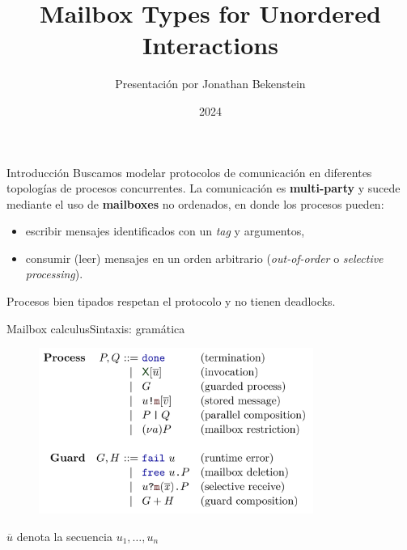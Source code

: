 \documentclass{beamer}
\title{Mailbox Types for Unordered Interactions\footnotemark}
\author{Presentación por Jonathan Bekenstein}
\institute{Materia optativa sobre Tipos Comportamentales y Contratos}
\date{2024}
\begin{document}

\begin{frame}{Introducción}
    Buscamos modelar protocolos de comunicación en diferentes topologías de procesos concurrentes. La comunicación es \textbf{multi-party} y sucede mediante el uso de \textbf{mailboxes} no ordenados, en donde los procesos pueden:
    \begin{itemize}
        \item escribir mensajes identificados con un \emph{tag} y argumentos,
        \item consumir (leer) mensajes en un orden arbitrario (\emph{out-of-order} o \emph{selective processing}).
    \end{itemize}

    \center
    \vspace{-1em}
    \vspace{-1em}

    Procesos bien tipados respetan el protocolo y no tienen deadlocks.
\end{frame}

\begin{frame}{Mailbox calculus}{Sintaxis: gramática}
    \begin{figure}[H]
        \centering
        \includegraphics[width=0.8\textwidth]{syntax}
    \end{figure}

    \footnotesize{$\overline{u}$ denota la secuencia $u_1, \dots, u_n$}
\end{frame}
\end{document}
